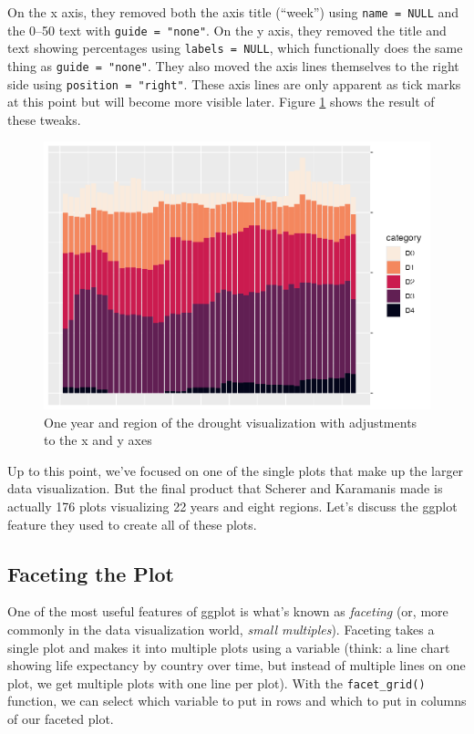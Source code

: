 \documentclass[
]{book}
\begin{document}
On the x axis, they removed both the axis title (``week'') using \texttt{name\ =\ NULL} and the 0--50 text with \texttt{guide\ =\ "none"}. On the y axis, they removed the title and text showing percentages using \texttt{labels\ =\ NULL}, which functionally does the same thing as \texttt{guide\ =\ "none"}. They also moved the axis lines themselves to the right side using \texttt{position\ =\ "right"}. These axis lines are only apparent as tick marks at this point but will become more visible later. Figure \ref{fig:southwest-2003-xy-scales-plot} shows the result of these tweaks.

\begin{figure}
\includegraphics[width=1\linewidth]{data-viz_files/figure-latex/southwest-2003-xy-scales-plot-1} \caption{One year and region of the drought visualization with adjustments to the x and y axes}\label{fig:southwest-2003-xy-scales-plot}
\end{figure}

Up to this point, we've focused on one of the single plots that make up the larger data visualization. But the final product that Scherer and Karamanis made is actually 176 plots visualizing 22 years and eight regions. Let's discuss the ggplot feature they used to create all of these plots.

\hypertarget{faceting-the-plot}{%
\subsection*{Faceting the Plot}\label{faceting-the-plot}}

One of the most useful features of ggplot is what's known as \emph{faceting} (or, more commonly in the data visualization world, \emph{small multiples}). Faceting takes a single plot and makes it into multiple plots using a variable (think: a line chart showing life expectancy by country over time, but instead of multiple lines on one plot, we get multiple plots with one line per plot). With the \texttt{facet\_grid()} function, we can select which variable to put in rows and which to put in columns of our faceted plot.
\end{document}
